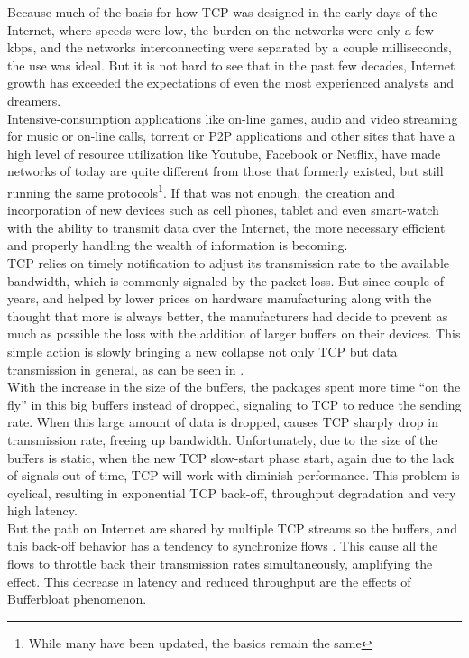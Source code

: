 Because much of the basis for how TCP was designed in the early days of the
Internet, where speeds were low, the burden on the networks were only a few
kbps, and the networks interconnecting were separated by a couple
milliseconds, the use was ideal. But it is not hard to see that in the past
few decades, Internet growth has exceeded the expectations of even the most
experienced analysts and dreamers.\\

Intensive-consumption applications like on-line games, audio and video
streaming for music or on-line calls, torrent or P2P applications and other
sites that have a high level of resource utilization like Youtube, Facebook or
Netflix, have made networks of today are quite different from those that
formerly existed, but still running the same protocols\footnote{While many
have been updated, the basics remain the same}. If that was not enough, the
creation and incorporation of new devices such as cell phones, tablet and even
smart-watch with the ability to transmit data over the Internet, the more
necessary efficient and properly handling the wealth of information is
becoming.\\

TCP relies on timely notification to adjust its transmission rate to the
available bandwidth, which is commonly signaled by the packet loss. But since
couple of years, and helped by lower prices on hardware manufacturing along
with the thought that more is always better, the manufacturers had decide to
prevent as much as possible the loss with the addition of larger buffers on
their devices. This simple action is slowly bringing a new collapse not only
TCP but data transmission in general, as can be seen in \cite{CACMStaff}.\\

With the increase in the size of the buffers, the packages spent more time
``on the fly'' in this big buffers instead of dropped, signaling to TCP to
reduce the sending rate. When this large amount of data is dropped, causes TCP
sharply drop in transmission rate, freeing up bandwidth. Unfortunately, due to
the size of the buffers is static, when the new TCP slow-start phase start,
again due to the lack of signals out of time, TCP will work with diminish
performance. This problem is cyclical, resulting in exponential TCP back-off,
throughput degradation and very high latency.\\

But the path on Internet are shared by multiple TCP streams so the buffers,
and this back-off behavior has a tendency to synchronize flows
\cite{main:ref:1}. This cause all the flows to throttle back their
transmission rates simultaneously, amplifying the effect. This decrease in
latency and reduced throughput are the effects of Bufferbloat phenomenon.\\
